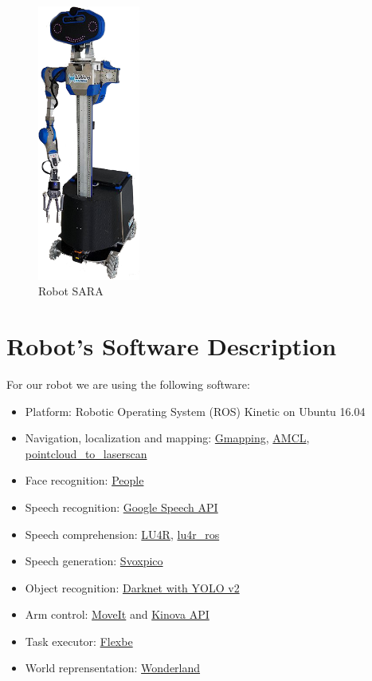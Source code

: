\begin{figure}
	\centering
	\includegraphics[width=0.30\textwidth]{images/sara_2.png}
	\caption{Robot SARA}
\end{figure}
\section*{Robot's Software Description}

For our robot we are using the following software:

\begin{itemize}
	\item Platform: Robotic Operating System (ROS) Kinetic on Ubuntu 16.04
	\item Navigation, localization and mapping: \href{http://wiki.ros.org/gmapping}{Gmapping}, \href{http://wiki.ros.org/amcl}{AMCL}, \href{http://wiki.ros.org/pointcloud_to_laserscan}{pointcloud\_to\_laserscan}
	\item Face recognition: \href{http://wiki.ros.org/people}{People}
	\item Speech recognition: \href{https://github.com/WalkingMachine/lab_ros_speech_to_text}{Google Speech API}
	\item Speech comprehension: \href{http://sag.art.uniroma2.it/lu4r.html}{LU4R}, \href{https://github.com/WalkingMachine/lu4r_ros}{lu4r\_ros}
	\item Speech generation: \href{https://doc.ubuntu-fr.org/svoxpico}{Svoxpico}
	\item Object recognition: \href{https://github.com/WalkingMachine/wm_darknet}{Darknet with YOLO v2 }
	\item Arm control: \href{http://wiki.ros.org/moveit}{MoveIt} and \href{https://github.com/Kinovarobotics/kinova-ros}{Kinova API}
	\item Task executor: \href{http://wiki.ros.org/flexbe}{Flexbe} 
	\item World reprensentation: \href{http://github.com/walkingmachine/wonderland}{Wonderland}
\end{itemize}